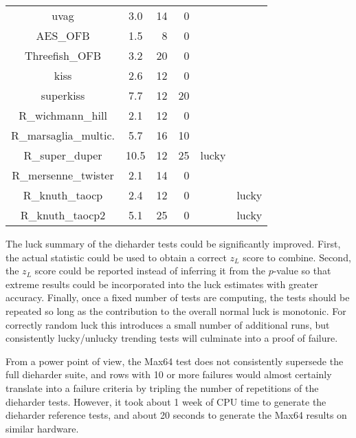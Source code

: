 \begin{table}
\begin{tabular}{|c|S[table-format=2.1]|r|r|c|c|}
uvag & 3.0 & 14 & 0 & & \\
AES\_OFB & 1.5 & 8 & 0 &  & \\
Threefish\_OFB & 3.2 & 20 & 0 & & \\
kiss & 2.6 & 12 & 0 &  & \\
superkiss & 7.7 & 12 & 20 & & \\
R\_wichmann\_hill & 2.1 & 12 & 0 &  & \\
R\_marsaglia\_multic. & 5.7 & 16 & 10 & & \\
R\_super\_duper & 10.5 & 12 & 25 & lucky & \\
R\_mersenne\_twister & 2.1 & 14 & 0 &  & \\
R\_knuth\_taocp & 2.4 & 12 & 0 &  & lucky \\
R\_knuth\_taocp2 & 5.1 & 25 & 0 & & lucky \\
\hline
\end{tabular}
\end{table}

The luck summary of the dieharder tests could be significantly improved.  First, the actual statistic could be used to obtain a correct $z_L$ score to combine.  Second, the $z_L$ score could be reported instead of inferring it from the $p$-value so that extreme results could be incorporated into the luck estimates with greater accuracy.  Finally, once a fixed number of tests are computing, the tests should be repeated so long as the contribution to the overall normal luck is monotonic.  For correctly random luck this introduces a small number of additional runs, but consistently lucky/unlucky trending tests will culminate into a proof of failure.

From a power point of view, the Max64 test does not consistently supersede the full dieharder suite, and rows with 10 or more failures would almost certainly translate into a failure criteria by tripling the number of repetitions of the dieharder tests.  However, it took about 1 week of CPU time to generate the dieharder reference tests, and about 20 seconds to generate the Max64 results on similar hardware.

